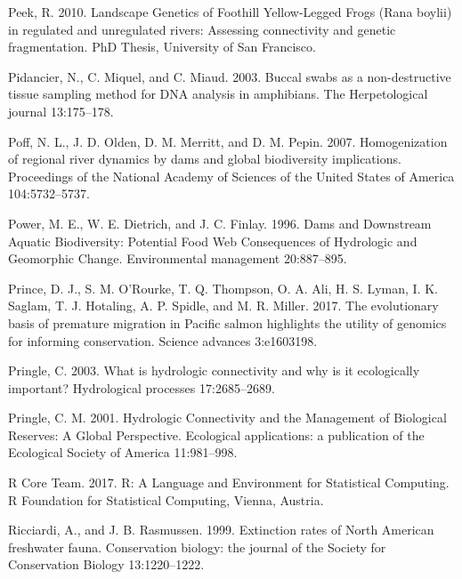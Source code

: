 \documentclass[twoside,12pt,final]{ucthesis-CA2012} %
\begin{document}
\begin{ucmainmatter}
\leavevmode\hypertarget{ref-peek_landscape_2010}{}%
Peek, R. 2010. Landscape Genetics of Foothill Yellow-Legged Frogs (Rana
boylii) in regulated and unregulated rivers: Assessing connectivity and
genetic fragmentation. PhD Thesis, University of San Francisco.

\leavevmode\hypertarget{ref-pidancier_buccal_2003}{}%
Pidancier, N., C. Miquel, and C. Miaud. 2003. Buccal swabs as a
non-destructive tissue sampling method for DNA analysis in amphibians.
The Herpetological journal 13:175--178.

\leavevmode\hypertarget{ref-poff_homogenization_2007}{}%
Poff, N. L., J. D. Olden, D. M. Merritt, and D. M. Pepin. 2007.
Homogenization of regional river dynamics by dams and global
biodiversity implications. Proceedings of the National Academy of
Sciences of the United States of America 104:5732--5737.

\leavevmode\hypertarget{ref-power_dams_1996}{}%
Power, M. E., W. E. Dietrich, and J. C. Finlay. 1996. Dams and
Downstream Aquatic Biodiversity: Potential Food Web Consequences of
Hydrologic and Geomorphic Change. Environmental management 20:887--895.

\leavevmode\hypertarget{ref-prince_evolutionary_2017}{}%
Prince, D. J., S. M. O'Rourke, T. Q. Thompson, O. A. Ali, H. S. Lyman,
I. K. Saglam, T. J. Hotaling, A. P. Spidle, and M. R. Miller. 2017. The
evolutionary basis of premature migration in Pacific salmon highlights
the utility of genomics for informing conservation. Science advances
3:e1603198.

\leavevmode\hypertarget{ref-pringle_what_2003}{}%
Pringle, C. 2003. What is hydrologic connectivity and why is it
ecologically important? Hydrological processes 17:2685--2689.

\leavevmode\hypertarget{ref-pringle_hydrologic_2001}{}%
Pringle, C. M. 2001. Hydrologic Connectivity and the Management of
Biological Reserves: A Global Perspective. Ecological applications: a
publication of the Ecological Society of America 11:981--998.

\leavevmode\hypertarget{ref-r_core_team_r:_2017}{}%
R Core Team. 2017. R: A Language and Environment for Statistical
Computing. R Foundation for Statistical Computing, Vienna, Austria.

\leavevmode\hypertarget{ref-ricciardi_extinction_1999}{}%
Ricciardi, A., and J. B. Rasmussen. 1999. Extinction rates of North
American freshwater fauna. Conservation biology: the journal of the
Society for Conservation Biology 13:1220--1222.


\end{ucmainmatter}
\end{document}
